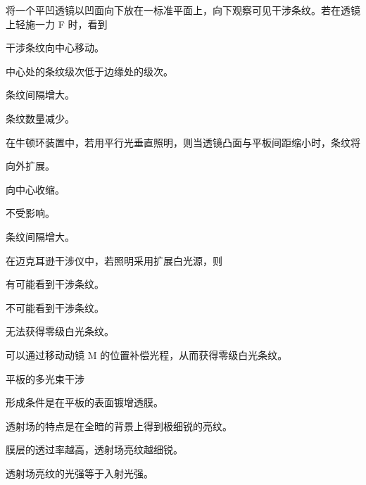 \documentclass[padl, analysis, notocnum]{ExBook}
\newcommand{\answerarea}[1][3.5cm]{%
  \par\vspace{1mm}%
  \noindent{\color{themeColor!35}\rule{\linewidth}{0.4pt}}\par
  \noindent\begin{minipage}[t][#1][t]{\linewidth}\vspace{0pt}\end{minipage}\par
  \noindent{\color{themeColor!35}\rule{\linewidth}{0.4pt}}\par
}
\begin{document}
\begin{qitems}[startnum=14]
\qitem 将一个平凹透镜以凹面向下放在一标准平面上，向下观察可见干涉条纹。若在透镜上轻施一力 F 时，看到
\par\noindent\hspace{2em}干涉条纹向中心移动。
\par\noindent\hspace{2em}中心处的条纹级次低于边缘处的级次。
\par\noindent\hspace{2em}条纹间隔增大。
\par\noindent\hspace{2em}条纹数量减少。
\label{q:217:start}
\answerarea[4.0cm]
\label{q:217:end}
\end{qitems}

\begin{qitems}[startnum=15]
\qitem 在牛顿环装置中，若用平行光垂直照明，则当透镜凸面与平板间距缩小时，条纹将
\par\noindent\hspace{2em}向外扩展。
\par\noindent\hspace{2em}向中心收缩。
\par\noindent\hspace{2em}不受影响。
\par\noindent\hspace{2em}条纹间隔增大。
\label{q:218:start}
\answerarea[4.0cm]
\label{q:218:end}
\end{qitems}

\begin{qitems}[startnum=16]
\qitem 在迈克耳逊干涉仪中，若照明采用扩展白光源，则
\par\noindent\hspace{2em}有可能看到干涉条纹。
\par\noindent\hspace{2em}不可能看到干涉条纹。
\par\noindent\hspace{2em}无法获得零级白光条纹。
\par\noindent\hspace{2em}可以通过移动动镜 M 的位置补偿光程，从而获得零级白光条纹。
\label{q:219:start}
\answerarea[4.0cm]
\label{q:219:end}
\end{qitems}

\begin{qitems}[startnum=17]
\qitem 平板的多光束干涉
\par\noindent\hspace{2em}形成条件是在平板的表面镀增透膜。
\par\noindent\hspace{2em}透射场的特点是在全暗的背景上得到极细锐的亮纹。
\par\noindent\hspace{2em}膜层的透过率越高，透射场亮纹越细锐。
\par\noindent\hspace{2em}透射场亮纹的光强等于入射光强。
\label{q:220:start}
\answerarea[4.0cm]
\label{q:220:end}
\end{qitems}
\end{document}
